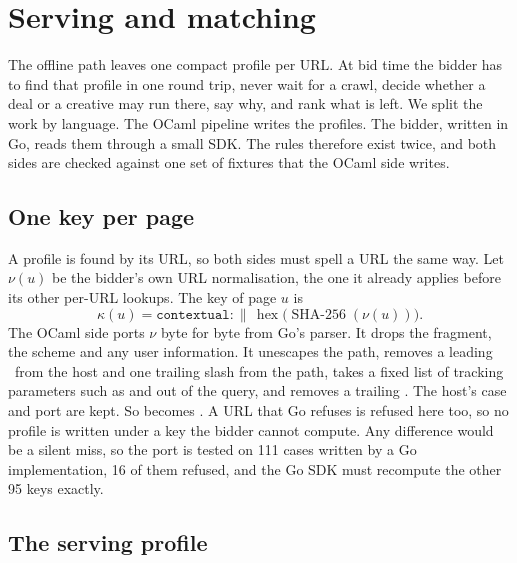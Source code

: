 \section{Serving and matching}\label{sec:serving}

The offline path leaves one compact profile per URL. At bid time the bidder
has to find that profile in one round trip, never wait for a crawl, decide
whether a deal or a creative may run there, say why, and rank what is left. We
split the work by language. The OCaml pipeline writes the profiles. The
bidder, written in Go, reads them through a small SDK. The rules therefore
exist twice, and both sides are checked against one set of fixtures that the
OCaml side writes.

\subsection{One key per page}\label{sec:serving-key}

A profile is found by its URL, so both sides must spell a URL the same way. Let
$\nu(u)$ be the bidder's own URL normalisation, the one it already applies
before its other per-URL lookups. The key of page $u$ is
\begin{equation}\label{eq:serving-key}
\kappa(u) = \texttt{contextual:} \,\|\, \operatorname{hex}\bigl(\operatorname{SHA\text{-}256}(\nu(u))\bigr).
\end{equation}
The OCaml side ports $\nu$ byte for byte from Go's  parser. It
drops the fragment, the scheme and any user information. It unescapes the
path, removes a leading \ from the host and one trailing slash from
the path, takes a fixed list of tracking parameters such as 
and  out of the query, and removes a trailing . The
host's case and port are kept. So
becomes . A URL that Go refuses is refused
here too, so no profile is written under a key the bidder cannot compute. Any
difference would be a silent miss, so the port is tested on 111 cases written
by a Go implementation, 16 of them refused, and the Go SDK must recompute the
other 95 keys exactly.

\subsection{The serving profile}\label{sec:serving-profile}

